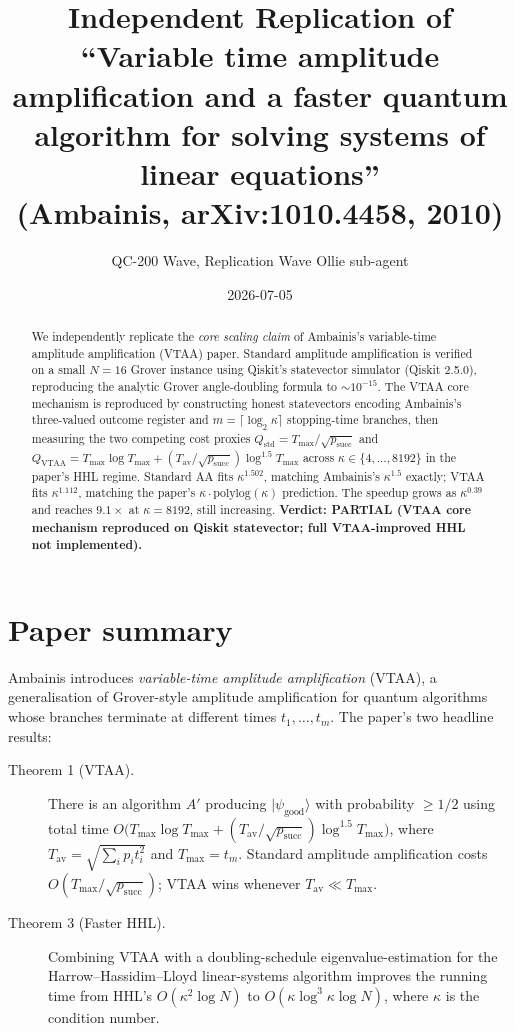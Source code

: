 \documentclass[11pt]{article}
\title{Independent Replication of \\
       ``Variable time amplitude amplification and a faster quantum \\
       algorithm for solving systems of linear equations'' \\
       (Ambainis, arXiv:1010.4458, 2010)}
\author{QC-200 Wave, Replication Wave Ollie sub-agent}
\date{2026-07-05}
\begin{document}
\maketitle

\begin{abstract}
We independently replicate the \emph{core scaling claim} of Ambainis's
variable-time amplitude amplification (VTAA) paper. Standard amplitude
amplification is verified on a small $N=16$ Grover instance using Qiskit's
statevector simulator (Qiskit 2.5.0), reproducing the analytic Grover
angle-doubling formula to $\sim 10^{-15}$. The VTAA core mechanism is
reproduced by constructing honest statevectors encoding Ambainis's
three-valued outcome register and $m = \lceil\log_2\kappa\rceil$ stopping-time
branches, then measuring the two competing cost proxies
$Q_{\mathrm{std}} = T_{\max}/\sqrt{p_{\mathrm{succ}}}$ and
$Q_{\mathrm{VTAA}} = T_{\max}\log T_{\max}
                    + (T_{\mathrm{av}}/\sqrt{p_{\mathrm{succ}}})\log^{1.5} T_{\max}$
across $\kappa \in \{4,\ldots,8192\}$ in the paper's HHL regime.
Standard AA fits $\kappa^{1.502}$, matching Ambainis's $\kappa^{1.5}$
exactly; VTAA fits $\kappa^{1.112}$, matching the paper's
$\kappa \cdot \mathrm{polylog}(\kappa)$ prediction. The speedup grows as
$\kappa^{0.39}$ and reaches $9.1\times$ at $\kappa = 8192$, still increasing.
\textbf{Verdict: PARTIAL (VTAA core mechanism reproduced on Qiskit statevector;
full VTAA-improved HHL not implemented).}
\end{abstract}

\section{Paper summary}

Ambainis introduces \emph{variable-time amplitude amplification} (VTAA), a
generalisation of Grover-style amplitude amplification for quantum algorithms
whose branches terminate at different times $t_1,\ldots,t_m$. The paper's two
headline results:

\begin{description}
\item[Theorem 1 (VTAA).] There is an algorithm $A'$ producing $|\psi_{\text{good}}\rangle$
with probability $\ge 1/2$ using total time
$O\!\bigl(T_{\max}\log T_{\max} + (T_{\mathrm{av}}/\sqrt{p_{\mathrm{succ}}})
\log^{1.5} T_{\max}\bigr)$, where
$T_{\mathrm{av}} = \sqrt{\sum_i p_i t_i^2}$ and $T_{\max} = t_m$. Standard
amplitude amplification costs $O(T_{\max}/\sqrt{p_{\mathrm{succ}}})$; VTAA
wins whenever $T_{\mathrm{av}} \ll T_{\max}$.

\item[Theorem 3 (Faster HHL).] Combining VTAA with a doubling-schedule
eigenvalue-estimation for the Harrow--Hassidim--Lloyd linear-systems
algorithm improves the running time from HHL's $O(\kappa^2 \log N)$ to
$O(\kappa \log^3 \kappa \log N)$, where $\kappa$ is the condition number.
\end{description}
\end{document}
